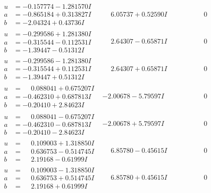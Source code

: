 \documentclass[1p]{elsarticle_modified}
\theoremstyle{definition}
\begin{document}
$$\begin{array}{c|c|c}
\begin{aligned}
u &= -0.157774 - 1.281570 I \\
a &= -0.865184 + 0.313827 I \\
b &= -2.04324 + 0.43736 I\end{aligned}
 & \phantom{-}6.05737 + 0.52590 I & \phantom{-0.000000 } 0 \\ \hline\begin{aligned}
u &= -0.299586 + 1.281380 I \\
a &= -0.315544 - 0.112531 I \\
b &= -1.39447 - 0.51312 I\end{aligned}
 & \phantom{-}2.64307 - 0.65871 I & \phantom{-0.000000 } 0 \\ \hline\begin{aligned}
u &= -0.299586 - 1.281380 I \\
a &= -0.315544 + 0.112531 I \\
b &= -1.39447 + 0.51312 I\end{aligned}
 & \phantom{-}2.64307 + 0.65871 I & \phantom{-0.000000 } 0 \\ \hline\begin{aligned}
u &= \phantom{-}0.088041 + 0.675207 I \\
a &= -0.462310 + 0.687813 I \\
b &= -0.20410 + 2.84623 I\end{aligned}
 & -2.00678 - 5.79597 I & \phantom{-0.000000 } 0 \\ \hline\begin{aligned}
u &= \phantom{-}0.088041 - 0.675207 I \\
a &= -0.462310 - 0.687813 I \\
b &= -0.20410 - 2.84623 I\end{aligned}
 & -2.00678 + 5.79597 I & \phantom{-0.000000 } 0 \\ \hline\begin{aligned}
u &= \phantom{-}0.109003 + 1.318850 I \\
a &= \phantom{-}0.636753 - 0.514745 I \\
b &= \phantom{-}2.19168 - 0.61999 I\end{aligned}
 & \phantom{-}6.85780 - 0.45615 I & \phantom{-0.000000 } 0 \\ \hline\begin{aligned}
u &= \phantom{-}0.109003 - 1.318850 I \\
a &= \phantom{-}0.636753 + 0.514745 I \\
b &= \phantom{-}2.19168 + 0.61999 I\end{aligned}
 & \phantom{-}6.85780 + 0.45615 I & \phantom{-0.000000 } 0 \\ \hline\begin{aligned}

\end{aligned}
\end{array}$$
\end{document}
